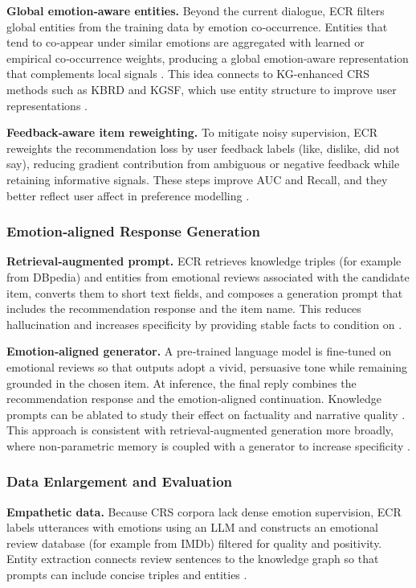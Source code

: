 \documentclass[12pt]{article}
\begin{document}
  \textbf{Global emotion‑aware entities.} Beyond the current dialogue, ECR filters global entities from the training data by emotion co‑occurrence. Entities that tend to co‑appear under similar emotions are aggregated with learned or empirical co‑occurrence weights, producing a global emotion‑aware representation that complements local signals \citep{zhang2024ecr}. This idea connects to KG-enhanced CRS methods such as KBRD and KGSF, which use entity structure to improve user representations \citep{chen2020kbrd,zhou2020kgsf}.
  


  \textbf{Feedback‑aware item reweighting.} To mitigate noisy supervision, ECR reweights the recommendation loss by user feedback labels (like, dislike, did not say), reducing gradient contribution from ambiguous or negative feedback while retaining informative signals. These steps improve AUC and Recall, and they better reflect user affect in preference modelling \citep{zhang2024ecr}.
  
  \subsubsection{Emotion‑aligned Response Generation}
  \textbf{Retrieval‑augmented prompt.} ECR retrieves knowledge triples (for example from DBpedia) and entities from emotional reviews associated with the candidate item, converts them to short text fields, and composes a generation prompt that includes the recommendation response and the item name. This reduces hallucination and increases specificity by providing stable facts to condition on \citep{zhang2024ecr,dbpedia_wikipedia,lewis2020rag}.
  
  \textbf{Emotion‑aligned generator.} A pre‑trained language model is fine‑tuned on emotional reviews so that outputs adopt a vivid, persuasive tone while remaining grounded in the chosen item. At inference, the final reply combines the recommendation response and the emotion‑aligned continuation. Knowledge prompts can be ablated to study their effect on factuality and narrative quality \citep{zhang2024ecr}. This approach is consistent with retrieval‑augmented generation more broadly, where non‑parametric memory is coupled with a generator to increase specificity \citep{lewis2020rag}.
  
  \subsubsection{Data Enlargement and Evaluation}
  \textbf{Empathetic data.} Because CRS corpora lack dense emotion supervision, ECR labels utterances with emotions using an LLM and constructs an emotional review database (for example from IMDb) filtered for quality and positivity. Entity extraction connects review sentences to the knowledge graph so that prompts can include concise triples and entities \citep{zhang2024ecr}.
  
\end{document}
